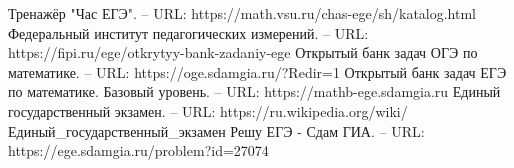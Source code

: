 \begin{thebibliography}{6}
	 Тренажёр "Час ЕГЭ". – URL: https://math.vsu.ru/chas-ege/sh/katalog.html
	Федеральный институт педагогических измерений. – URL:  https://fipi.ru/ege/otkrytyy-bank-zadaniy-ege
	Открытый банк задач ОГЭ по математике. – URL:  https://oge.sdamgia.ru/?Redir=1
	Открытый банк задач ЕГЭ по математике. Базовый уровень. – URL:  https://mathb-ege.sdamgia.ru
	 Единый государственный экзамен. – URL:  https://ru.wikipedia.org/wiki/Единый\_государственный\_экзамен
	Решу ЕГЭ - Сдам ГИА. – URL: https://ege.sdamgia.ru/problem?id=27074
\end{thebibliography}